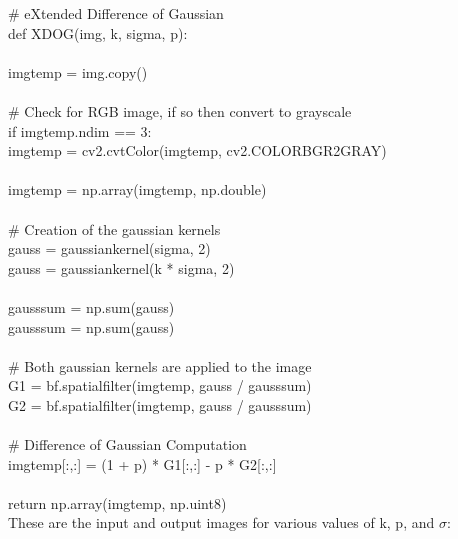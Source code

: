 \documentclass{article}
\begin{document}
	\noindent \# eXtended Difference of Gaussian\\
	\noindent def XDOG(img, k, sigma, p):\\
	\\
	\indent img\textunderscore temp = img.copy()\\
	\\
	\indent \#    Check for RGB image, if so then convert to grayscale\\
	\indent if img\textunderscore temp.ndim == 3:\\
	\indent \indent img\textunderscore temp = cv2.cvtColor(img\textunderscore temp, cv2.COLOR\textunderscore BGR2GRAY)\\
	\\
	\indent img\textunderscore temp = np.array(img\textunderscore temp, np.double)\\
	\\
	\indent \#    Creation of the gaussian kernels\\
	\indent gauss = gaussian\textunderscore kernel(sigma, 2)\\		\indent gauss = gaussian\textunderscore kernel(k * sigma, 2)\\
	\\
	\indent gauss\textunderscore sum = np.sum(gauss)\\
	\indent gauss\textunderscore sum = np.sum(gauss)\\
	\\
	\indent \#    Both gaussian kernels are applied to the image\\
	\indent G1 = bf.spatial\textunderscore filter(img\textunderscore temp, \indent gauss / gauss\textunderscore sum)\\
	\indent G2 = bf.spatial\textunderscore filter(img\textunderscore temp, \indent gauss / gauss\textunderscore sum)\\
	\\
	\indent \#    Difference of Gaussian Computation\\
	\indent img\textunderscore temp[:,:] = (1 + p) * G1[:,:] - p * G2[:,:]\\
	\\
	\indent return np.array(img\textunderscore temp, np.uint8)\\
		
	These are the input and output images for various values of k, p, and $\sigma$:\\
		
\end{document}
